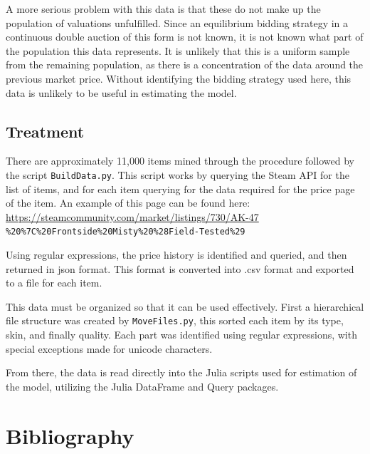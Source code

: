 \documentclass[12pt, letterpaper]{paper}
\begin{document}
A more serious problem with this data is that these do not make up the
population of valuations unfulfilled. Since an equilibrium bidding
strategy in a continuous double auction of this form is not known, it
is not known what part of the population this data represents. It is
unlikely that this is a uniform sample from the remaining population,
as there is a concentration of the data around the previous market
price. Without identifying the bidding strategy used here, this data
is unlikely to be useful in estimating the model.

\subsection{Treatment}
\label{sec-3-3}

There are approximately 11,000 items mined through the procedure
followed by the script \texttt{BuildData.py}. This script works by querying
the Steam API for the list of items, and for each item querying for
the data required for the price page of the item. An example of this
page can be found
here: \url{https://steamcommunity.com/market/listings/730/AK-47}
\texttt{\%20\%7C\%20Frontside\%20Misty\%20\%28Field-Tested\%29}

Using regular expressions, the price history is identified and
queried, and then returned in json format. This format is converted
into .csv format and exported to a file for each item.

This data must be organized so
that it can be used effectively. First a hierarchical file structure
was created by \texttt{MoveFiles.py}, this sorted each item by its type,
skin, and finally quality. Each part was identified using regular
expressions, with special exceptions made for unicode characters.

From there, the data is read directly into the Julia scripts used for
estimation of the model, utilizing the Julia DataFrame and Query packages.

\section{Bibliography}
\label{sec-4}


\end{document}
